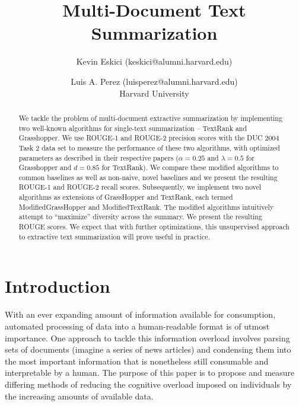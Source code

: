 \documentclass[11pt]{article}
\title{Multi-Document Text Summarization}
\author{Kevin Eskici (keskici@alumni.harvard.edu) \and Luis A. Perez (luisperez@alumni.harvard.edu)\\
Harvard University}
\begin{document}
\maketitle{}

\begin{abstract}
   We tackle the problem of multi-document extractive summarization by implementing two well-known algorithms for single-text summarization -- {\sc TextRank} and {\sc Grasshopper}.  We use ROUGE-1 and ROUGE-2 precision scores with the DUC 2004 Task 2 data set to measure the performance of these two algorithms, with optimized parameters as described in their respective papers ($\alpha =0.25$ and $\lambda=0.5$ for Grasshopper and $d=0.85$ for TextRank). We compare these modified algorithms to common baselines as well as non-naive, novel baselines and we present the resulting ROUGE-1 and ROUGE-2 recall scores. Subsequently, we implement two novel algorithms as extensions of {\sc GrassHopper} and {\sc TextRank}, each termed {\sc ModifiedGrassHopper} and {\sc ModifiedTextRank}. The modified algorithms intuitively attempt to ``maximize'' diversity across the summary. We present the resulting ROUGE scores. We expect that with further optimizations, this unsupervised approach to extractive text summarization will prove useful in practice.
\end{abstract}

\section{Introduction}
With an ever expanding amount of information available for consumption, automated processing of data into a human-readable format is of utmost importance. One approach to tackle this information overload involves  parsing sets of documents (imagine a series of news articles) and condensing them into the most important information that is nonetheless still consumable and interpretable by a human. The purpose of this paper is to propose and measure differing methods of reducing the cognitive overload imposed on individuals by the increasing amounts of available data.
\end{document}
